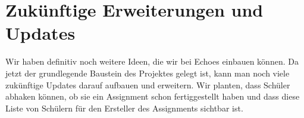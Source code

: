 \documentclass[a4paper, titlepage]{article}
\begin{document}
    \section{Zukünftige Erweiterungen und Updates}
    Wir haben definitiv noch weitere Ideen, die wir bei Echoes einbauen können. Da jetzt der grundlegende Baustein des Projektes gelegt ist, kann man noch viele zukünftige Updates darauf aufbauen und erweitern. Wir planten, dass Schüler abhaken können, ob sie ein Assignment schon fertiggestellt haben und dass diese Liste von Schülern für den Ersteller des Assignments sichtbar ist.
    

    \newpage
  
\end{document}
